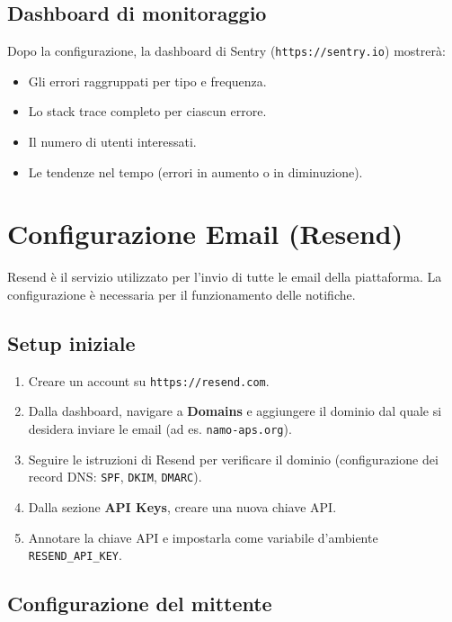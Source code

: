 \documentclass[a4paper,11pt,oneside]{book}
\begin{document}
\subsection{Dashboard di monitoraggio}

Dopo la configurazione, la dashboard di Sentry (\texttt{https://sentry.io}) mostrer\`a:

\begin{itemize}[leftmargin=1.5em]
  \item Gli errori raggruppati per tipo e frequenza.
  \item Lo stack trace completo per ciascun errore.
  \item Il numero di utenti interessati.
  \item Le tendenze nel tempo (errori in aumento o in diminuzione).
\end{itemize}

\section{Configurazione Email (Resend)}
\label{sec:configurazione-resend}

Resend \`e il servizio utilizzato per l'invio di tutte le email della piattaforma. La configurazione \`e necessaria per il funzionamento delle notifiche.

\subsection{Setup iniziale}

\begin{enumerate}[leftmargin=1.5em]
  \item Creare un account su \texttt{https://resend.com}.
  \item Dalla dashboard, navigare a \textbf{Domains} e aggiungere il dominio dal quale si desidera inviare le email (ad es. \texttt{namo-aps.org}).
  \item Seguire le istruzioni di Resend per verificare il dominio (configurazione dei record DNS: \texttt{SPF}, \texttt{DKIM}, \texttt{DMARC}).
  \item Dalla sezione \textbf{API Keys}, creare una nuova chiave API.
  \item Annotare la chiave API e impostarla come variabile d'ambiente \texttt{RESEND\_API\_KEY}.
\end{enumerate}

\subsection{Configurazione del mittente}
\end{document}
